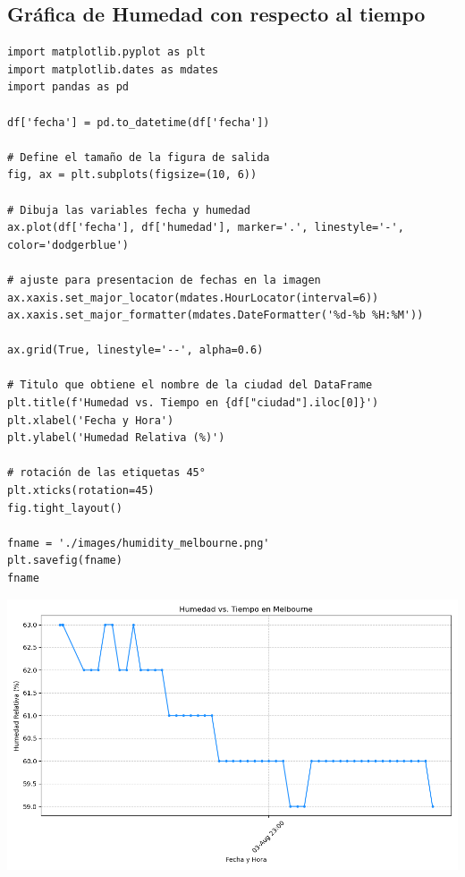 \documentclass[11pt]{article}
\begin{document}
\subsection{Gráfica de Humedad con respecto al tiempo}
\label{sec:orgcc60fdb}

\begin{verbatim}
import matplotlib.pyplot as plt
import matplotlib.dates as mdates
import pandas as pd

df['fecha'] = pd.to_datetime(df['fecha'])

# Define el tamaño de la figura de salida
fig, ax = plt.subplots(figsize=(10, 6))

# Dibuja las variables fecha y humedad
ax.plot(df['fecha'], df['humedad'], marker='.', linestyle='-', color='dodgerblue')

# ajuste para presentacion de fechas en la imagen
ax.xaxis.set_major_locator(mdates.HourLocator(interval=6))
ax.xaxis.set_major_formatter(mdates.DateFormatter('%d-%b %H:%M'))

ax.grid(True, linestyle='--', alpha=0.6)

# Titulo que obtiene el nombre de la ciudad del DataFrame
plt.title(f'Humedad vs. Tiempo en {df["ciudad"].iloc[0]}')
plt.xlabel('Fecha y Hora')
plt.ylabel('Humedad Relativa (%)')

# rotación de las etiquetas 45°
plt.xticks(rotation=45)
fig.tight_layout()

fname = './images/humidity_melbourne.png'
plt.savefig(fname)
fname
\end{verbatim}

\begin{center}
\includegraphics[width=.9\linewidth]{./images/humidity_melbourne.png}
\end{center}
\end{document}
